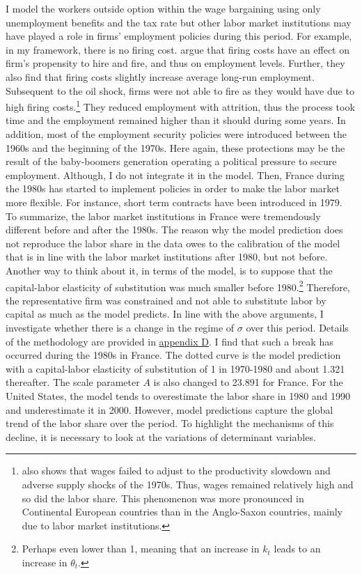 I model the workers outside option within the wage bargaining using only unemployment benefits and the tax rate but other labor market institutions may have played a role in firms' employment policies during this period. For example, in my framework, there is no firing cost. \cite{Bentolila1990} argue that firing costs have an effect on firm's propensity to hire and fire, and thus on employment levels. Further, they also find that firing costs slightly increase average long-run employment. Subsequent to the oil shock, firms were not able to fire as they would have due to high firing costs.\footnote{\cite{Blanchard1997} also shows that wages failed to adjust to the productivity slowdown and adverse supply shocks of the 1970s. Thus, wages remained relatively high and so did the labor share. This phenomenon was more pronounced in Continental European countries than in the Anglo-Saxon countries, mainly due to labor market institutions.} They reduced employment with attrition, thus the process took time and the employment remained higher than it should during some years. In addition, most of the employment security policies were introduced between the 1960s and the beginning of the 1970s. Here again, these protections may be the result of the baby-boomers generation operating a political pressure to secure employment. Although, I do not integrate it in the model. Then, France during the 1980s has started to implement policies in order to make the labor market more flexible. For instance, short term contracts have been introduced in 1979. To summarize, the labor market institutions in France were tremendously different before and after the 1980s. The reason why the model prediction does not reproduce the labor share in the data owes to the calibration of the model that is in line with the labor market institutions after 1980, but not before. Another way to think about it, in terms of the model, is to suppose that the capital-labor elasticity of substitution was much smaller before 1980.\footnote{Perhaps even lower than 1, meaning that an increase in $k_t$ leads to an increase in $\theta_t$.} Therefore, the representative firm was constrained and not able to substitute labor by capital as much as the model predicts.
In line with the above arguments, I investigate whether there is a change in the regime of $\sigma$ over this period. Details of the methodology are provided in \hyperref[appendix:regime]{appendix D}. I find that such a break has occurred during the 1980s in France. The dotted curve is the model prediction with a capital-labor elasticity of substitution of 1 in 1970-1980 and about 1.321 thereafter. The scale parameter $A$ is also changed to 23.891 for France.
For the United States, the model tends to overestimate the labor share in 1980 and 1990 and underestimate it in 2000.
However, model predictions capture the global trend of the labor share over the period.
To highlight the mechanisms of this decline, it is necessary to look at the variations of determinant variables.

